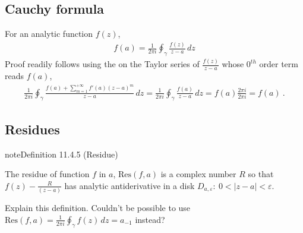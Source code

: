 \documentclass[letterpaper,10pt,english]{jupyterBook}
\begin{document}
\subsection{Cauchy formula}
\label{\detokenize{ch/complex/analysis:cauchy-formula}}\label{\detokenize{ch/complex/analysis:complex-analysis-mero-fun-cauchy-formula}}
\sphinxAtStartPar
For an analytic function \(f(z)\),
\begin{equation*}
\begin{split}f(a) = \frac{1}{2 \pi i} \oint_{\gamma} \frac{f(z)}{z-a} \, dz\end{split}
\end{equation*}
\sphinxAtStartPar
Proof readily follows using the {\hyperref[\detokenize{ch/complex/analysis:complex-analysis-useful-int-path-independence-z-n}]{}} on the Taylor series of \(\frac{f(z)}{z-a}\) whose \(0^{th}\) order term reads \(f(a)\),
\begin{equation*}
\begin{split}\frac{1}{2\pi i} \oint_{\gamma} \frac{f(a)+\sum_{m=1}^{+\infty} f'(a) (z-a)^m}{z-a} \, dz = \frac{1}{2\pi i} \oint_{\gamma} \frac{f(a)}{z-a} \, dz = f(a) \frac{2 \pi i}{2 \pi i} = f(a) \ .\end{split}
\end{equation*}

\subsection{Residues}
\label{\detokenize{ch/complex/analysis:residues}}\label{\detokenize{ch/complex/analysis:complex-analysis-mero-fun-residues}}\label{ch/complex/analysis:definition-5}
\begin{sphinxadmonition}{note}{Definition 11.4.5 (Residue)}



\sphinxAtStartPar
The residue of function \(f\) in \(a\), \(\text{Res}(f,a)\) is a complex number \(R\) so that \(f(z) - \frac{R}{(z-a)}\) has analytic antiderivative in a disk \(D_{a,\varepsilon}: \ 0 < |z-a| < \varepsilon\).
\end{sphinxadmonition}

\sphinxAtStartPar
{} Explain this definition. Couldn’t be possible to use \(\text{Res}(f,a) = \frac{1}{2 \pi i} \oint_{\gamma} f(z) \, dz = a_{-1}\) instead?
\end{document}
